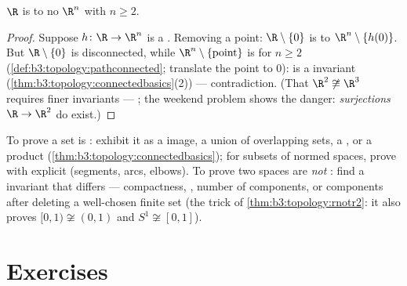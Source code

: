 \begin{theorem}\label{thm:b3:topology:rnotr2}
$\R$ is  to no $\R^n$ with $n \geq 2$.
\end{theorem}

\begin{proof}
Suppose $h \colon \R \to \R^n$ is a . Removing a
point: $\R \setminus \{0\}$ is  to $\R^n \setminus
\{h(0)\}$. But $\R\setminus\{0\}$ is disconnected, while
$\R^n\setminus\{\text{point}\}$ is  for $n \geq
2$ (\cref{def:b3:topology:pathconnected}; translate the point to
$0$):  is a  invariant
(\cref{thm:b3:topology:connectedbasics}(2)) --- contradiction.
(That $\R^2 \not\cong \R^3$ requires finer invariants ---
 ; the weekend problem shows the danger:
\emph{ surjections} $\R \to \R^2$ do exist.)
\end{proof}

\begin{method}\label{met:b3:topology:connectargument}
To prove a set is : exhibit it as a  image,
a union of overlapping  sets, a , or a product
(\cref{thm:b3:topology:connectedbasics}); for subsets of normed
spaces, prove  with explicit  (segments,
arcs, elbows). To prove two spaces are \emph{not} :
find a  invariant that differs --- compactness,
, number of components, or components after
deleting a well-chosen finite set (the trick of
\cref{thm:b3:topology:rnotr2}: it also proves $[0,1) \not\cong
(0,1)$ and $S^1 \not\cong [0,1]$).
\end{method}

\section{Exercises}

